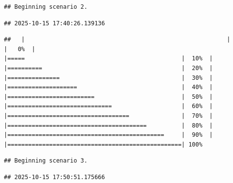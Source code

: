 \documentclass[
]{article}
\begin{document}
\begin{verbatim}
## Beginning scenario 2.
\end{verbatim}

\begin{verbatim}
## 2025-10-15 17:40:26.139136
\end{verbatim}

\begin{verbatim}
##   |                                                          |                                                  |   0%  |                                                          |=====                                             |  10%  |                                                          |==========                                        |  20%  |                                                          |===============                                   |  30%  |                                                          |====================                              |  40%  |                                                          |=========================                         |  50%  |                                                          |==============================                    |  60%  |                                                          |===================================               |  70%  |                                                          |========================================          |  80%  |                                                          |=============================================     |  90%  |                                                          |==================================================| 100%
\end{verbatim}

\begin{verbatim}
## Beginning scenario 3.
\end{verbatim}

\begin{verbatim}
## 2025-10-15 17:50:51.175666
\end{verbatim}
\end{document}
